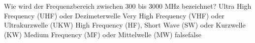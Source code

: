     {Wie wird der Frequenzbereich zwischen 300 bis 3000 MHz bezeichnet?}
    {Ultra High Frequency (UHF) oder Dezimeterwelle}
    {Very High Frequency (VHF) oder Ultrakurzwelle (UKW)}
    {High Frequency (HF), Short Wave (SW) oder Kurzwelle (KW)}
    {Medium Frequency (MF) oder Mittelwelle (MW)}
    {false}{false}